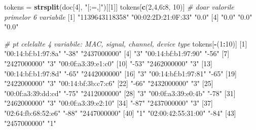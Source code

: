 \documentclass[]{article}
\newenvironment{Shaded}{\begin{snugshade}}{\end{snugshade}}
\newcommand{\KeywordTok}[1]{\textcolor[rgb]{0.13,0.29,0.53}{\textbf{#1}}}
\newcommand{\DecValTok}[1]{\textcolor[rgb]{0.00,0.00,0.81}{#1}}
\newcommand{\StringTok}[1]{\textcolor[rgb]{0.31,0.60,0.02}{#1}}
\newcommand{\CommentTok}[1]{\textcolor[rgb]{0.56,0.35,0.01}{\textit{#1}}}
\newcommand{\OperatorTok}[1]{\textcolor[rgb]{0.81,0.36,0.00}{\textbf{#1}}}
\newcommand{\NormalTok}[1]{#1}
\begin{document}
\begin{Shaded}
\begin{Highlighting}[]
\NormalTok{tokens =}\StringTok{ }\KeywordTok{strsplit}\NormalTok{(doc[}\DecValTok{4}\NormalTok{], }\StringTok{"[;=,]"}\NormalTok{)[[}\DecValTok{1}\NormalTok{]]}
\NormalTok{tokens[}\KeywordTok{c}\NormalTok{(}\DecValTok{2}\NormalTok{,}\DecValTok{4}\NormalTok{,}\DecValTok{6}\OperatorTok{:}\DecValTok{8}\NormalTok{, }\DecValTok{10}\NormalTok{)] }\CommentTok{# doar valorile primelor 6 variabile}
\NormalTok{[}\DecValTok{1}\NormalTok{] }\StringTok{"1139643118358"}     \StringTok{"00:02:2D:21:0F:33"} \StringTok{"0.0"}              
\NormalTok{[}\DecValTok{4}\NormalTok{] }\StringTok{"0.0"}               \StringTok{"0.0"}               \StringTok{"0.0"}              

\CommentTok{# pt celelalte 4 variabile: MAC, signal, channel, device type}
\NormalTok{tokens[}\OperatorTok{-}\NormalTok{(}\DecValTok{1}\OperatorTok{:}\DecValTok{10}\NormalTok{)]}
\NormalTok{ [}\DecValTok{1}\NormalTok{] }\StringTok{"00:14:bf:b1:97:8a"} \StringTok{"-38"}               \StringTok{"2437000000"}       
\NormalTok{ [}\DecValTok{4}\NormalTok{] }\StringTok{"3"}                 \StringTok{"00:14:bf:b1:97:90"} \StringTok{"-56"}              
\NormalTok{ [}\DecValTok{7}\NormalTok{] }\StringTok{"2427000000"}        \StringTok{"3"}                 \StringTok{"00:0f:a3:39:e1:c0"}
\NormalTok{[}\DecValTok{10}\NormalTok{] }\StringTok{"-53"}               \StringTok{"2462000000"}        \StringTok{"3"}                
\NormalTok{[}\DecValTok{13}\NormalTok{] }\StringTok{"00:14:bf:b1:97:8d"} \StringTok{"-65"}               \StringTok{"2442000000"}       
\NormalTok{[}\DecValTok{16}\NormalTok{] }\StringTok{"3"}                 \StringTok{"00:14:bf:b1:97:81"} \StringTok{"-65"}              
\NormalTok{[}\DecValTok{19}\NormalTok{] }\StringTok{"2422000000"}        \StringTok{"3"}                 \StringTok{"00:14:bf:3b:c7:c6"}
\NormalTok{[}\DecValTok{22}\NormalTok{] }\StringTok{"-66"}               \StringTok{"2432000000"}        \StringTok{"3"}                
\NormalTok{[}\DecValTok{25}\NormalTok{] }\StringTok{"00:0f:a3:39:dd:cd"} \StringTok{"-75"}               \StringTok{"2412000000"}       
\NormalTok{[}\DecValTok{28}\NormalTok{] }\StringTok{"3"}                 \StringTok{"00:0f:a3:39:e0:4b"} \StringTok{"-78"}              
\NormalTok{[}\DecValTok{31}\NormalTok{] }\StringTok{"2462000000"}        \StringTok{"3"}                 \StringTok{"00:0f:a3:39:e2:10"}
\NormalTok{[}\DecValTok{34}\NormalTok{] }\StringTok{"-87"}               \StringTok{"2437000000"}        \StringTok{"3"}                
\NormalTok{[}\DecValTok{37}\NormalTok{] }\StringTok{"02:64:fb:68:52:e6"} \StringTok{"-88"}               \StringTok{"2447000000"}       
\NormalTok{[}\DecValTok{40}\NormalTok{] }\StringTok{"1"}                 \StringTok{"02:00:42:55:31:00"} \StringTok{"-84"}              
\NormalTok{[}\DecValTok{43}\NormalTok{] }\StringTok{"2457000000"}        \StringTok{"1"}                
\end{Highlighting}
\end{Shaded}
\end{document}
